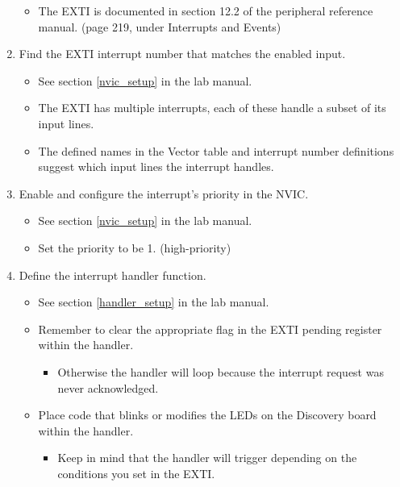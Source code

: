 \documentclass[11pt,fleqn]{book} %
\begin{document}
\begin{enumerate}
\begin{itemize}
\begin{itemize}
        \end{itemize}
        \item The EXTI is documented in section 12.2 of the peripheral reference manual. (page 219, under Interrupts and Events)
    \end{itemize}
    \item Find the EXTI interrupt number that matches the enabled input.
    \begin{itemize}
        \item  See section \ref{nvic_setup} in the lab manual.
        \item The EXTI has multiple interrupts, each of these handle a subset of its input lines.
        \item  The defined names in the Vector table and interrupt number definitions suggest which input lines the interrupt handles.
    \end{itemize}
    \item Enable and configure the interrupt's priority in the NVIC.
    \begin{itemize}
        \item See section \ref{nvic_setup} in the lab manual.
        \item Set the priority to be 1. (high-priority)
    \end{itemize}
    \item Define the interrupt handler function.
    \begin{itemize}
        \item See section \ref{handler_setup} in the lab manual.
        \item Remember to clear the appropriate flag in the EXTI pending register within the handler.
        \begin{itemize}
            \item  Otherwise the handler will loop because the interrupt request was never acknowledged.
        \end{itemize}
        \item Place code that blinks or modifies the LEDs on the Discovery board within the handler.
        \begin{itemize}
            \item Keep in mind that the handler will trigger depending on the conditions you set in the EXTI. 
        \end{itemize}
    \end{itemize}
\end{enumerate}
\end{document}
